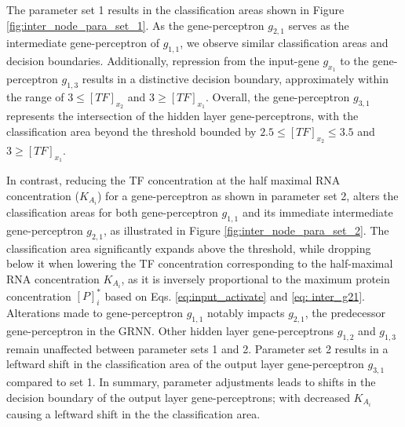 \documentclass[twocolumn]{biophys-new}
\begin{document}
{{%
The parameter set 1 results in the  classification areas shown in Figure \ref{fig:inter_node_para_set_1}. As the gene-perceptron $g_{2,1}$ serves as the intermediate gene-perceptron of $g_{1,1}$, we observe similar classification areas and decision boundaries.
Additionally, repression from the input-gene $g_{x_1}$ to the gene-perceptron $g_{1,3}$ results in  a distinctive decision boundary,  approximately within the range of $3 \leq [TF]_{x_2}$ and $3 \geq [TF]_{x_1}$. Overall, the gene-perceptron $g_{3,1}$ represents the intersection of the hidden layer gene-perceptrons, with the classification area beyond the threshold bounded by $2.5 \leq [TF]_{x_2} \leq 3.5$ and $3 \geq [TF]_{x_1}$. 

In contrast, reducing the TF concentration at the half maximal RNA concentration ($K_{A_i}$) for a gene-perceptron as shown in parameter set 2, alters the classification areas for both gene-perceptron $g_{1,1}$ and its immediate intermediate gene-perceptron $g_{2,1}$, as illustrated in Figure \ref{fig:inter_node_para_set_2}. 
The classification area significantly expands  above the threshold, while dropping below it when lowering the TF concentration corresponding to the half-maximal RNA concentration $K_{A_i}$, as it is inversely proportional to the maximum protein concentration $[P]^*_i$ based on  Eqs. \ref{eq:input_activate} and \ref{eq: inter_g21}. Alterations made to gene-perceptron $g_{1,1}$ notably impacts  $g_{2,1}$, the predecessor gene-perceptron in the GRNN.  Other hidden layer gene-perceptrons $g_{1,2}$ and $g_{1,3}$ remain unaffected between parameter sets 1 and 2. Parameter set 2 results in a leftward shift in the classification area of the output layer gene-perceptron $g_{3,1}$ compared to set 1. 
In summary, parameter adjustments leads to shifts in the decision boundary of the output layer gene-perceptrons; with decreased $K_{A_i}$ causing a  leftward shift in the the classification area. %


}}
\end{document}
